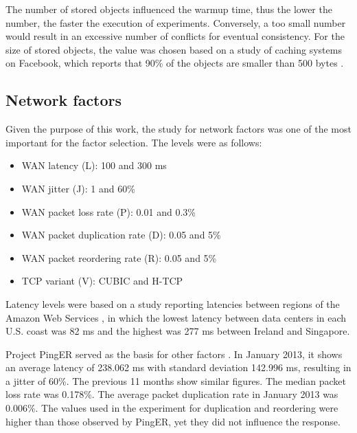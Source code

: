 \documentclass[doublespacing]{bmcart}
\begin{document}
The number of stored objects influenced the warmup time, thus the lower the
number, the faster the execution of experiments. Conversely, a too small number
would result in an excessive number of conflicts for eventual consistency. For
the size of stored objects, the value was chosen based on a study of caching
systems on Facebook, which reports that 90\% of the objects are smaller than
500 bytes \cite{Atikoglu2012}.

\subsection{Network factors}

Given the purpose of this work, the study for network factors was one of the
most important for the factor selection. The levels were as follows:

\begin{itemize}

\item WAN latency (L): 100 and 300 ms

\item WAN jitter (J): 1 and 60\%

\item WAN packet loss rate (P): 0.01 and 0.3\%

\item WAN packet duplication rate (D): 0.05 and 5\%

\item WAN packet reordering rate (R): 0.05 and 5\%

\item TCP variant (V): CUBIC and H-TCP

\end{itemize}

Latency levels were based on a study reporting latencies between regions of the
Amazon Web Services \cite{Sovran2011}, in which the lowest latency between data
centers in each U.S. coast was 82 ms and the highest was 277 ms between Ireland
and Singapore.

Project PingER served as the basis for other factors \cite{PingER2013}. In
January 2013, it shows an average latency of 238.062 ms with standard deviation
142.996 ms, resulting in a jitter of 60\%. The previous 11 months show similar
figures. The median packet loss rate was 0.178\%. The average packet
duplication rate in January 2013 was 0.006\%. The values used in the experiment
for duplication and reordering were higher than those observed by PingER, yet
they did not influence the response.
\end{document}
